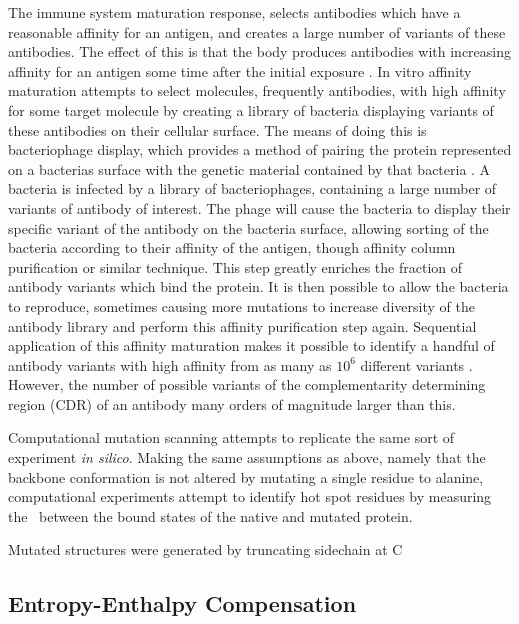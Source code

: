 The immune system maturation response, selects antibodies which have a reasonable affinity for an antigen, and creates a large number of variants of these antibodies. 
The effect of this is that the body produces antibodies with increasing affinity for an antigen some time after the initial exposure \cite{griffiths1984somatic}.
In vitro affinity maturation attempts to select molecules, frequently antibodies, with high affinity for some target molecule by creating a library of bacteria displaying variants of these antibodies on their cellular surface.
The means of doing this is bacteriophage display, which provides a method of pairing the protein represented on a bacterias surface with the genetic material contained by that bacteria \cite{smith1985filamentous}.
A bacteria is infected by a library of bacteriophages, containing a large number of variants of antibody of interest.
The phage will cause the bacteria to display their specific variant of the antibody on the bacteria surface, allowing sorting of the bacteria according to their affinity of the antigen, though affinity column purification or similar technique.
This step greatly enriches the fraction of antibody variants which bind the protein.
It is then possible to allow the bacteria to reproduce, sometimes causing more mutations to increase diversity of the antibody library and perform this affinity purification step again.
Sequential application of this affinity maturation makes it possible to identify a handful of antibody variants with high affinity from as many as $10^{6}$ different variants \cite{gram1992vitro,hawkins1992selection}.
However, the number of possible variants of the complementarity determining region (CDR) of an antibody many orders of magnitude larger than this.

Computational mutation scanning attempts to replicate the same sort of experiment {\it in silico}.
Making the same assumptions as above, namely that the backbone conformation is not altered by mutating a single residue to alanine, computational experiments attempt to identify hot spot residues by measuring the \ddg\ between the bound states of the native and mutated protein.

Mutated structures were generated by truncating sidechain at C\subscript{$\gamma$} 
\cite{massova1999computational}

\cite{kuroda2012computer}


\subsection{Entropy-Enthalpy Compensation}


